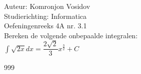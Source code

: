 \documentclass[a4paper]{article}
\newcommand{\dint}{\displaystyle\int}
\begin{document}
	
	\noindent \large Auteur: Komronjon Vosidov \\
	\noindent \large Studierichting: Informatica\\
	\noindent \large Oefeningenreeks 4A nr. 3.1\\
	
	
	\medskip
	\normalsize
	Bereken de volgende onbepaalde integralen:\\
	
	$ \dint \sqrt{2x} dx = \dfrac{2 \sqrt{2}}{3} x^{\tfrac{3}{2}} + C $
	
	
\begin{thebibliography}{999}
\end{thebibliography}		
\end{document}
